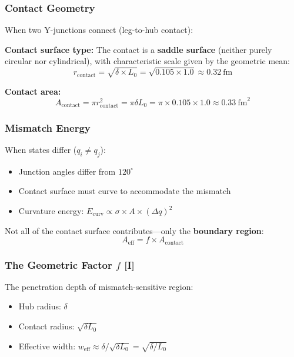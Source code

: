 \subsubsection{Contact Geometry}

When two Y-junctions connect (leg-to-hub contact):

\textbf{Contact surface type:} The contact is a \textbf{saddle surface} (neither purely circular nor cylindrical), with characteristic scale given by the geometric mean:
\begin{equation}
    r_{\text{contact}} = \sqrt{\delta \times L_0} = \sqrt{0.105 \times 1.0} \approx 0.32~\text{fm}
\end{equation}

\textbf{Contact area:}
\begin{equation}
    A_{\text{contact}} = \pi r_{\text{contact}}^2 = \pi \delta L_0 = \pi \times 0.105 \times 1.0 \approx 0.33~\text{fm}^2
\end{equation}

\subsubsection{Mismatch Energy}

When states differ ($q_i \neq q_j$):
\begin{itemize}
    \item Junction angles differ from $120^\circ$
    \item Contact surface must curve to accommodate the mismatch
    \item Curvature energy: $E_{\text{curv}} \propto \sigma \times A \times (\Delta q)^2$
\end{itemize}

Not all of the contact surface contributes---only the \textbf{boundary region}:
\begin{equation}
    A_{\text{eff}} = f \times A_{\text{contact}}
\end{equation}

\subsubsection{The Geometric Factor $f$ [I]}

The penetration depth of mismatch-sensitive region:
\begin{itemize}
    \item Hub radius: $\delta$
    \item Contact radius: $\sqrt{\delta L_0}$
    \item Effective width: $w_{\text{eff}} \approx \delta / \sqrt{\delta L_0} = \sqrt{\delta / L_0}$
\end{itemize}

